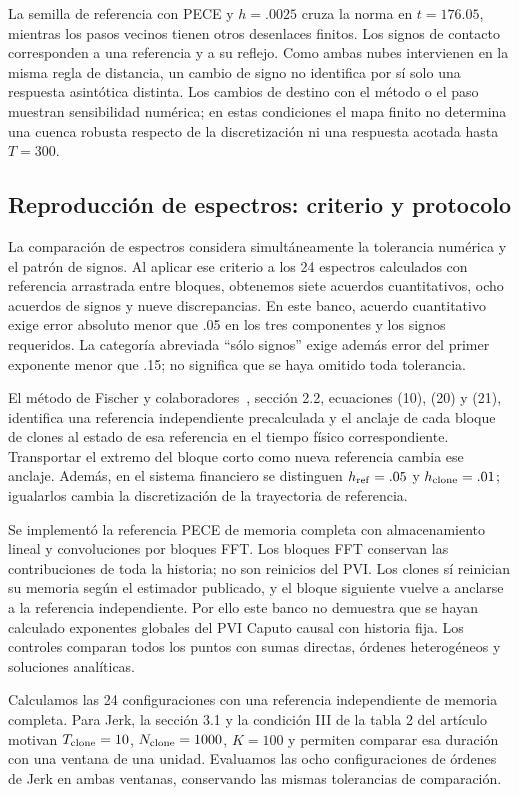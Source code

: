 La semilla de referencia con PECE y $h=.0025$ cruza la norma en $t=176.05$,
mientras los pasos vecinos tienen otros desenlaces finitos. Los signos de
contacto corresponden a una referencia y a su reflejo. Como ambas nubes
intervienen en la misma regla de distancia, un cambio de signo no identifica
por sí solo una respuesta asintótica distinta. Los cambios de destino con
el método o el paso muestran sensibilidad numérica; en estas condiciones el mapa
finito no determina una cuenca robusta respecto de la discretización ni una
respuesta acotada hasta $T=300$.

\subsection{Reproducción de espectros: criterio y protocolo}

La comparación de espectros considera simultáneamente la tolerancia
numérica y el patrón de signos. Al aplicar ese criterio a los 24 espectros
calculados con referencia arrastrada entre bloques, obtenemos siete acuerdos
cuantitativos, ocho acuerdos de signos y nueve discrepancias.
En este banco, acuerdo cuantitativo exige error absoluto menor que .05 en
los tres componentes y los signos requeridos. La categoría abreviada
``sólo signos'' exige además error del primer exponente menor que .15;
no significa que se haya omitido toda tolerancia.

El método de Fischer y colaboradores~\cite{fischer2020}, sección 2.2,
ecuaciones (10), (20) y (21), identifica una referencia independiente
precalculada y el anclaje de cada bloque de clones al estado de esa
referencia en el tiempo físico correspondiente. Transportar el extremo del bloque corto como nueva referencia cambia
ese anclaje. Además, en el sistema financiero se distinguen
$h_{\rm ref}=.05$ y $h_{\rm clone}=.01$; igualarlos cambia la
discretización de la trayectoria de referencia.

Se implementó la referencia PECE de memoria completa con almacenamiento
lineal y convoluciones por bloques FFT. Los bloques FFT conservan las
contribuciones de toda la historia; no son reinicios del PVI. Los clones
sí reinician su memoria según el estimador publicado, y el bloque
siguiente vuelve a anclarse a la referencia independiente. Por ello este
banco no demuestra que se hayan calculado exponentes globales del PVI
Caputo causal con historia fija. Los controles comparan todos los puntos
con sumas directas, órdenes heterogéneos y soluciones analíticas.

Calculamos las 24 configuraciones con una referencia independiente de
memoria completa.
Para Jerk, la sección 3.1 y la condición III de la tabla 2 del artículo
motivan $T_{\rm clone}=10$, $N_{\rm clone}=1000$, $K=100$ y permiten comparar esa duración con una ventana de una unidad.
Evaluamos las ocho configuraciones de órdenes de Jerk en ambas ventanas,
conservando las mismas tolerancias de comparación.

